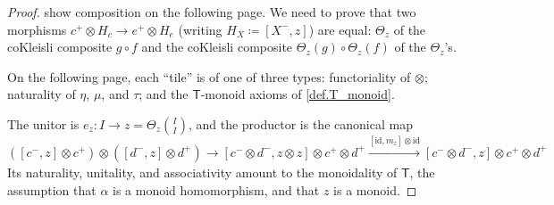 \documentclass[11pt, oneside, article]{memoir}
\theoremstyle{definition}
\theoremstyle{plain}
\newcommand{\fun}[1]{\mathrm{#1}}%
\newcommand{\Fun}[1]{\mathsf{#1}}%
\newcommand{\id}{\mathrm{id}}
\newcommand{\To}[2][]{\xrightarrow[#1]{#2}}
\newcommand{\ev}{\fun{ev}}
\newcommand{\inpt}[1]{#1^{-}}
\newcommand{\outp}[1]{#1^{+}}
\begin{document}
\begin{proof}
show composition on the following page. We need to prove that two morphisms $\outp c\otimes H_c\to\outp e\otimes H_e$ (writing $H_X\coloneqq[\inpt X,z]$) are equal: $\Theta_z$ of the coKleisli composite $g\circ f$ and the coKleisli composite $\Theta_z(g)\circ\Theta_z(f)$ of the $\Theta_z$'s. 

On the following page, each ``tile'' is of one of three types: functoriality of $\otimes$; naturality of $\eta$, $\mu$, and $\tau$; and the $\Fun T$-monoid axioms of \cref{def.T_monoid}. 

The unitor is $e_z\colon I\to z=\Theta_z\binom{I}{I}$, and the productor is the canonical map
\[
([\inpt c,z]\otimes\outp c)\otimes([\inpt d,z]\otimes\outp d)
\to
[\inpt c\otimes\inpt d,z\otimes z]\otimes\outp c\otimes\outp d\To{[\id,m_z]\otimes\id}
[\inpt c\otimes\inpt d,z]\otimes\outp c\otimes\outp d
\]
Its naturality, unitality, and associativity amount to the monoidality of $\Fun{T}$, the assumption that $\alpha$ is a monoid homomorphism, and that $z$ is a monoid.



\end{proof}
\end{document}
